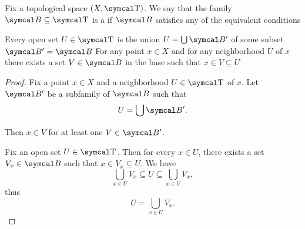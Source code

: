 \begin{definition}\label{def:topological_base}\cite[12]{Engelking1989}
  Fix a topological space \( (X, \CT) \). We say that the family \( \Cal{B} \subseteq \CT \) is a  if \( \Cal{B} \) satisfies any of the equivalent conditions
  \begin{defenum}
     Every open set \( U \in \CT \) is the union \( U = \bigcup \Cal{B}' \) of some subset \( \Cal{B}' = \Cal{B} \)
     For any point \( x \in X \) and for any neighborhood \( U \) of \( x \) there exists a set \( V \in \Cal{B} \) in the base such that \( x \in V \subseteq U \)
  \end{defenum}
\end{definition}
\begin{proof}
   Fix a point \( x \in X \) and a neighborhood \( U \in \CT \) of \( x \). Let \( \Cal{B}' \) be a subfamily of \( \Cal{B} \) such that
  \begin{equation*}
    U = \bigcup \Cal{B}'.
  \end{equation*}

  Then \( x \in V \) for at least one \( V \in \Cal{B}' \).

   Fix an open set \( U \in \CT \). Then for every \( x \in U \), there exists a set \( V_x \in \Cal{B} \) such that \( x \in V_x \subseteq U \). We have
  \begin{equation*}
    \bigcup_{x \in U} V_x \subseteq U \subseteq \bigcup_{x \in U} V_x,
  \end{equation*}
  thus
  \begin{equation*}
    U = \bigcup_{x \in U} V_x.
  \end{equation*}
\end{proof}

